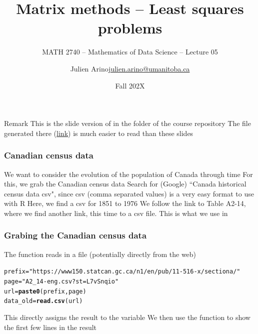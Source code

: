 \documentclass[aspectratio=169]{beamer}\usepackage[]{graphicx}\usepackage[]{xcolor}
\subtitle{MATH 2740 -- Mathematics of Data Science -- Lecture 05}
\author{\texorpdfstring{Julien Arino\newline\url{julien.arino@umanitoba.ca}}{Julien Arino}}
\institute{Department of Mathematics @ University of Manitoba}
\date{Fall 202X}
\title{Matrix methods -- Least squares problems}
\makeatletter
\newcommand{\hlsng}[1]{\textcolor[rgb]{0.192,0.494,0.8}{#1}}%
\newcommand{\hldef}[1]{\textcolor[rgb]{0.345,0.345,0.345}{#1}}%
\newcommand{\hlkwb}[1]{\textcolor[rgb]{0.69,0.353,0.396}{#1}}%
\newcommand{\hlkwd}[1]{\textcolor[rgb]{0.737,0.353,0.396}{\textbf{#1}}}%
\newenvironment{kframe}{%
 \def\at@end@of@kframe{}%
 \ifinner\ifhmode%
  \def\at@end@of@kframe{\end{minipage}}%
  \begin{minipage}{\columnwidth}%
 \fi\fi%
 \def\FrameCommand##1{\hskip\@totalleftmargin \hskip-\fboxsep
 \colorbox{shadecolor}{##1}\hskip-\fboxsep
     \hskip-\linewidth \hskip-\@totalleftmargin \hskip\columnwidth}%
 \MakeFramed {\advance\hsize-\width
   \@totalleftmargin\z@ \linewidth\hsize
   \@setminipage}}%
 {\par\unskip\endMakeFramed%
 \at@end@of@kframe}
\newenvironment{knitrout}{}{} %
\makeatother
\begin{document}




\begin{frame}{Remark}
This is the slide version of  in the folder  of the course repository
\vfill
The  file generated there (\href{https://julien-arino.github.io/math-of-data-science/CODE/Canada-census-get-plot-data.html}{link}) is much easier to read than these slides
\end{frame}

\begin{frame}\frametitle{Canadian census data}
We want to consider the evolution of the population of Canada through time
\vfill
For this, we grab the Canadian census data
\vfill Search for (Google) ``Canada historical census data csv", since csv (comma separated values) is a very easy format to use with R
\vfill
Here, we find a csv for 1851 to 1976
\vfill
We follow the link to Table A2-14, where we find another link, this time to a csv file. This is what we use in 
\end{frame}


\begin{frame}[fragile]
\frametitle{Grabing the Canadian census data}
The function  reads in a file (potentially directly from the web)
\vfill
\begin{knitrout}
\color{fgcolor}\begin{kframe}
\begin{alltt}
\hldef{prefix} \hlkwb{=} \hlsng{"https://www150.statcan.gc.ca/n1/en/pub/11-516-x/sectiona/"}
\hldef{page} \hlkwb{=} \hlsng{"A2_14-eng.csv?st=L7vSnqio"}
\hldef{url} \hlkwb{=} \hlkwd{paste0}\hldef{(prefix, page)}
\hldef{data_old} \hlkwb{=} \hlkwd{read.csv}\hldef{(url)}
\end{alltt}
\end{kframe}
\end{knitrout}
\vfill
This directly assigns the result to the variable 
\vfill
We then use the function  to show the first few lines in the result
\end{frame}
\end{document}
